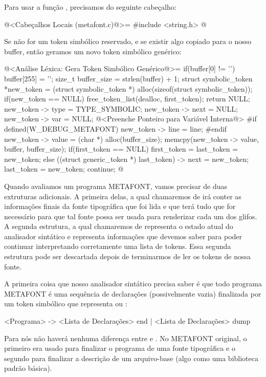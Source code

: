 Para usar a função , precisamos do seguinte
cabeçalho:

\iniciocodigo
@<Cabeçalhos Locais (metafont.c)@>=
#include <string.h>
@
\fimcodigo

Se não for um token simbólico reservado, e se existir algo copiado
para o nosso buffer, então geramos um novo token simbólico genérico:

\iniciocodigo
@<Análise Léxica: Gera Token Simbólico Genérico@>=
if(buffer[0] != '\0'){
  buffer[255] = '\0';
  size_t buffer_size = strlen(buffer) + 1;
  struct symbolic_token *new_token =
     (struct symbolic_token *) alloc(sizeof(struct symbolic_token));
  if(new_token == NULL){
    free_token_list(dealloc, first_token);
    return NULL;
  }
  new_token -> type = TYPE_SYMBOLIC;
  new_token -> next = NULL;
  new_token -> var = NULL;
  @<Preenche Ponteiro para Variável Interna@>
#if defined(W_DEBUG_METAFONT)
  new_token -> line = line;
#endif
  new_token -> value = (char *) alloc(buffer_size);
  memcpy(new_token -> value, buffer, buffer_size);
  if(first_token == NULL)
    first_token = last_token = new_token;
  else{
    ((struct generic_token *) last_token) -> next = new_token;
    last_token = new_token;
  }
  continue;
}
@
\fimcodigo



Quando avaliamos um programa METAFONT, vamos precisar de duas
extruturas adicionais. A primeira delas, a qual chamaremos
de  irá conter as informações finais da
fonte tipográfica que foi lida e que terá tudo que for necessário para
que tal fonte possa ser usada para renderizar cada um dos glifos. A
segunda estrutura, a qual chamaremos de 
representa o estado atual do analisador sintático e representa
informações que devemos saber para poder continuar interpretando
corretamente uma lista de tokens. Essa segunda estrutura pode ser
descartada depois de terminarmos de ler os tokens de nossa fonte.

A primeira coisa que nosso analisador sintático precisa saber é que
todo programa METAFONT é uma sequência de declarações (possivelmente
vazia) finalizada por um token simbólico que
representa  ou :

\alinhaverbatim
<Programa> -> <Lista de Declarações> end | <Lista de Declarações> dump
\alinhanormal

Para nós não haverá nenhuma diferença entre 
e . No METAFONT original, o primeiro era usado para
finalizar o programa de uma fonte tipográfica e o segundo para
finalizar a descrição de um arquivo-base (algo como uma biblioteca
padrão básica).

